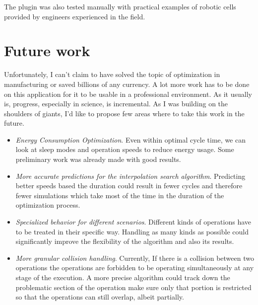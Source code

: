 The plugin was also tested manually with practical examples of robotic cells provided by engineers experienced in the field. \\

\section{Future work}

Unfortunately, I can't claim to have solved the topic of optimization in manufacturing or saved billions of any currency. 
A lot more work has to be done on this application for it to be usable in a  professional environment.
As it usually is, progress, especially in science, is incremental.
As I was building on the shoulders of giants, I'd like to propose few areas where to take this work in the future.

\begin{itemize}
    \item \emph{Energy Consumption Optimization}. Even within optimal cycle time, we can look at sleep modes and operation speeds to reduce energy usage. Some preliminary work was already made \cite{EnergyOptimisationBukata} with good results.

    \item \emph{More accurate predictions for the interpolation search algorithm}. Predicting better speeds based the duration could result in fewer cycles and therefore fewer simulations which take most of the time in the duration of the optimization process.      

    \item \emph{Specialized behavior for different scenarios}. Different kinds of operations have to be treated in their specific way. Handling as many kinds as possible could significantly improve the flexibility of the algorithm and also its results.
    
    \item \emph{More granular collision handling}. Currently, If there is a collision between two operations the operations are forbidden to be operating simultaneously at any stage of the execution. A more precise algorithm could track down the problematic section of the operation make sure only that portion is restricted so that the operations can still overlap, albeit partially.
    
\end{itemize}



